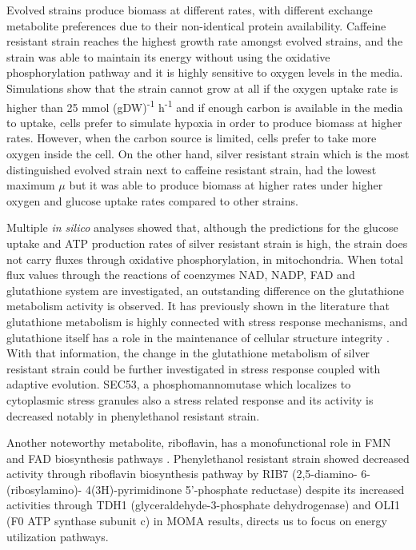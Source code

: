 Evolved strains produce biomass at different rates, with different exchange metabolite preferences due to their non-identical protein availability. Caffeine resistant strain reaches the highest growth rate amongst evolved strains, and the strain was able to maintain its energy without using the oxidative phosphorylation pathway and it is highly sensitive to oxygen levels in the media. Simulations show that the strain cannot grow at all if the oxygen uptake rate is higher than 25 mmol (gDW)\textsuperscript{-1} h\textsuperscript{-1} and if enough carbon is available in the media to uptake, cells prefer to simulate hypoxia in order to produce biomass at higher rates. However, when the carbon source is limited, cells prefer to take more oxygen inside the cell. On the other hand, silver resistant strain which is the most distinguished evolved strain next to caffeine resistant strain, had the lowest maximum $\mu$ but it was able to produce biomass at higher rates under higher oxygen and glucose uptake rates compared to other strains.

Multiple \emph{in silico} analyses showed that, although the predictions for the glucose uptake and ATP production rates of silver resistant strain is high, the strain does not carry fluxes through oxidative phosphorylation, in mitochondria. When total flux values through the reactions of coenzymes NAD, NADP, FAD and glutathione system are investigated, an outstanding difference on the glutathione metabolism activity is observed. It has previously shown in the literature that glutathione metabolism is highly connected with stress response mechanisms, and glutathione itself has a role in the maintenance of cellular structure integrity \cite{penninckx2002overview}. With that information, the change in the glutathione metabolism of silver resistant strain could be further investigated in stress response coupled with adaptive evolution. SEC53, a phosphomannomutase which localizes to cytoplasmic stress granules also a stress related response\cite{kepes1988yeast} and its activity is decreased notably in phenylethanol resistant strain.

Another noteworthy metabolite, riboflavin, has a monofunctional role in FMN and FAD biosynthesis pathways \cite{oltmanns1972biosynthesis}. Phenylethanol resistant strain showed decreased activity through riboflavin biosynthesis pathway by RIB7 (2,5-diamino- 6-(ribosylamino)- 4(3H)-pyrimidinone 5'-phosphate reductase) despite its increased activities through TDH1 (glyceraldehyde-3-phosphate dehydrogenase) and OLI1 (F0 ATP synthase subunit c) in MOMA results, directs us to focus on energy utilization pathways.

